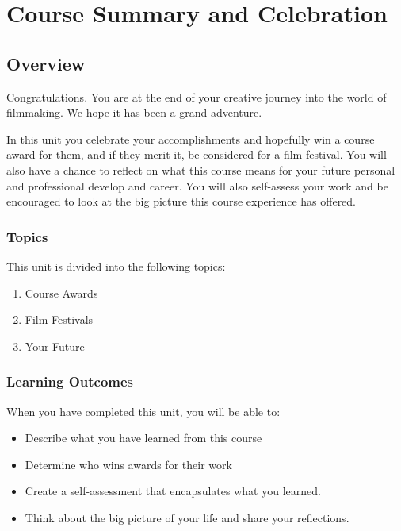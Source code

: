 \documentclass[
  letterpaper,
  DIV=11,
  numbers=noendperiod]{scrreprt}
\providecommand{\tightlist}{%
  \setlength{\itemsep}{0pt}\setlength{\parskip}{0pt}}\usepackage{longtable,booktabs,array}
\begin{document}

\chapter{Course Summary and
Celebration}\label{course-summary-and-celebration}

\section*{Overview}\label{overview-9}


Congratulations. You are at the end of your creative journey into the
world of filmmaking. We hope it has been a grand adventure.

In this unit you celebrate your accomplishments and hopefully win a
course award for them, and if they merit it, be considered for a film
festival. You will also have a chance to reflect on what this course
means for your future personal and professional develop and career. You
will also self-assess your work and be encouraged to look at the big
picture this course experience has offered.

\subsection*{Topics}\label{topics-9}

This unit is divided into the following topics:

\begin{enumerate}
\def\labelenumi{\arabic{enumi}.}
\tightlist
\item
  Course Awards
\item
  Film Festivals
\item
  Your Future
\end{enumerate}

\subsection*{Learning Outcomes}\label{learning-outcomes-9}

When you have completed this unit, you will be able to:

\begin{itemize}
\tightlist
\item
  Describe what you have learned from this course
\item
  Determine who wins awards for their work
\item
  Create a self-assessment that encapsulates what you learned.
\item
  Think about the big picture of your life and share your reflections.
\end{itemize}
\end{document}
